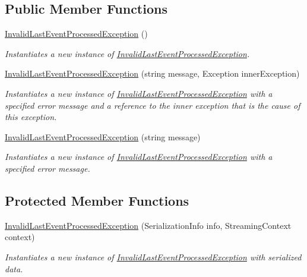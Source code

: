 \subsection*{Public Member Functions}
\begin{DoxyCompactItemize}
\item 
\hyperlink{classCqrs_1_1EventStore_1_1Bus_1_1InvalidLastEventProcessedException_aa941d9b0c42053195d592ed07bcfcb08_aa941d9b0c42053195d592ed07bcfcb08}{Invalid\+Last\+Event\+Processed\+Exception} ()
\begin{DoxyCompactList}\small\item\em Instantiates a new instance of \hyperlink{classCqrs_1_1EventStore_1_1Bus_1_1InvalidLastEventProcessedException}{Invalid\+Last\+Event\+Processed\+Exception}. \end{DoxyCompactList}\item 
\hyperlink{classCqrs_1_1EventStore_1_1Bus_1_1InvalidLastEventProcessedException_ac0de4bdfa1896dfae88644a2ae422145_ac0de4bdfa1896dfae88644a2ae422145}{Invalid\+Last\+Event\+Processed\+Exception} (string message, Exception inner\+Exception)
\begin{DoxyCompactList}\small\item\em Instantiates a new instance of \hyperlink{classCqrs_1_1EventStore_1_1Bus_1_1InvalidLastEventProcessedException}{Invalid\+Last\+Event\+Processed\+Exception} with a specified error message and a reference to the inner exception that is the cause of this exception. \end{DoxyCompactList}\item 
\hyperlink{classCqrs_1_1EventStore_1_1Bus_1_1InvalidLastEventProcessedException_a01e8e2b27b64b5404f20bcfa2627b06c_a01e8e2b27b64b5404f20bcfa2627b06c}{Invalid\+Last\+Event\+Processed\+Exception} (string message)
\begin{DoxyCompactList}\small\item\em Instantiates a new instance of \hyperlink{classCqrs_1_1EventStore_1_1Bus_1_1InvalidLastEventProcessedException}{Invalid\+Last\+Event\+Processed\+Exception} with a specified error message. \end{DoxyCompactList}\end{DoxyCompactItemize}
\subsection*{Protected Member Functions}
\begin{DoxyCompactItemize}
\item 
\hyperlink{classCqrs_1_1EventStore_1_1Bus_1_1InvalidLastEventProcessedException_aa14bdf5c6f8c0227dd3919b1fed91417_aa14bdf5c6f8c0227dd3919b1fed91417}{Invalid\+Last\+Event\+Processed\+Exception} (Serialization\+Info info, Streaming\+Context context)
\begin{DoxyCompactList}\small\item\em Instantiates a new instance of \hyperlink{classCqrs_1_1EventStore_1_1Bus_1_1InvalidLastEventProcessedException}{Invalid\+Last\+Event\+Processed\+Exception} with serialized data. \end{DoxyCompactList}\end{DoxyCompactItemize}


